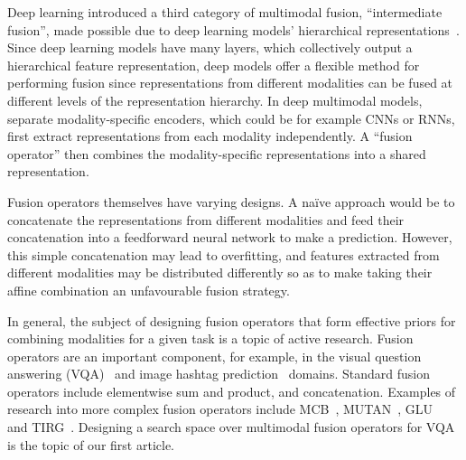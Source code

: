Deep learning introduced a third category of multimodal fusion, ``intermediate
fusion'', made possible due to deep learning models' hierarchical
representations~\cite{ramachandram2017deepmultimodal}.
Since deep learning models have many layers, which collectively output a
hierarchical feature representation, deep models offer a flexible method for
performing fusion since representations from different modalities can be fused
at different levels of the representation hierarchy.
In deep multimodal models, separate modality-specific encoders, which could be
for example CNNs or RNNs, first extract representations from each modality
independently.
A ``fusion operator'' then combines the modality-specific representations into
a shared representation.

Fusion operators themselves have varying designs. A na\"ive approach would be to
concatenate the representations from different modalities and feed their
concatenation into a feedforward neural network to make a prediction.
However, this simple concatenation may lead to overfitting, and features
extracted from different modalities may be distributed differently so as to
make taking their affine combination an unfavourable fusion strategy.

In general, the subject of designing fusion operators that form effective
priors for combining modalities for a given task is a topic of active research.
Fusion operators are an important component, for example, in the visual
question answering (VQA)~\cite{fukui2016multimodalCB} and image hashtag
prediction~\cite{durand2020learninguserreps} domains.
Standard fusion operators include elementwise sum and product, and
concatenation.
Examples of research into more complex fusion operators include
MCB~\cite{fukui2016multimodalCB}, MUTAN~\cite{ben2017mutan},
GLU~\cite{dauphin2017languagemodeling} and TIRG~\cite{vo2019composing}.
Designing a search space over multimodal fusion operators for VQA is the topic
of our first article.
